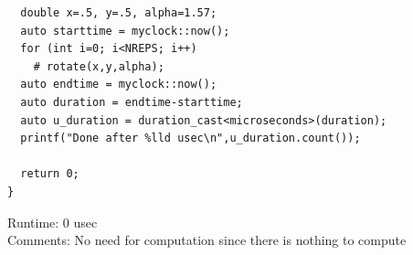 \documentclass{report}
\begin{document}
\begin{enumerate}
\begin{verbatim}
  double x=.5, y=.5, alpha=1.57;
  auto starttime = myclock::now();
  for (int i=0; i<NREPS; i++)
    # rotate(x,y,alpha);
  auto endtime = myclock::now();
  auto duration = endtime-starttime;
  auto u_duration = duration_cast<microseconds>(duration);
  printf("Done after %lld usec\n",u_duration.count());

  return 0;
}
\end{verbatim}
Runtime: 0 usec
\\Comments: No need for computation since there is nothing to compute

\end{enumerate}
\end{document}
